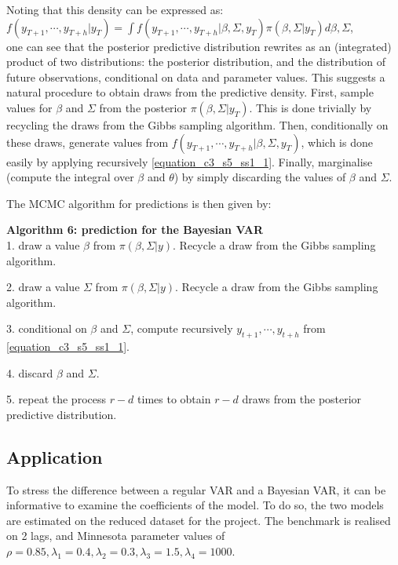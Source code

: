 Noting that this density can be expressed as: \\
$f(y_{T+1}, \cdots, y_{T+h}| y_T) = \int f(y_{T+1}, \cdots, y_{T+h}| \beta, \Sigma, y_T) \pi(\beta, \Sigma|y_T) d \beta, \Sigma$, \\ one can see that the posterior predictive distribution rewrites as an (integrated) product of two distributions: the
posterior distribution, and the distribution of future observations, conditional on data and parameter values. This suggests a natural procedure to obtain draws from the predictive density. First, sample values for $\beta$ and $\Sigma$ from the posterior $\pi(\beta, \Sigma|y_T)$. This is done trivially by recycling the draws from the Gibbs sampling algorithm. Then, conditionally on these draws, generate values from $f(y_{T+1}, \cdots, y_{T+h}| \beta, \Sigma, y_T)$, which is done easily by applying recursively \ref{equation_c3_s5_ss1_1}. Finally, marginalise (compute the integral over $\beta$ and $\theta$) by simply discarding the values of $\beta$ and $\Sigma$.

The MCMC algorithm for predictions is then given by:

\textbf{Algorithm 6: prediction for the Bayesian VAR} \vspace{3mm} \\
1. draw a value $\beta$ from $\pi(\beta, \Sigma|y)$. Recycle a draw from the Gibbs sampling algorithm.

2. draw a value $\Sigma$ from $\pi(\beta, \Sigma|y)$. Recycle a draw from the Gibbs sampling algorithm.

3. conditional on $\beta$ and $\Sigma$, compute recursively $y_{t+1}, \cdots, y_{t+h}$ from \ref{equation_c3_s5_ss1_1}.

4. discard $\beta$ and $\Sigma$.

5. repeat the process $r-d$ times to obtain $r-d$ draws from the posterior predictive distribution.



\subsection{Application}
\label{chapter3_section5_subsection4}


To stress the difference between a regular VAR and a Bayesian VAR, it can be informative to examine the coefficients of the model. To do so, the two models are estimated on the reduced dataset for the project. The benchmark is realised on 2 lags, and Minnesota parameter values of $\rho = 0.85, \lambda_1 = 0.4, \lambda_2 = 0.3, \lambda_3 = 1.5, \lambda_4 = 1000$.

